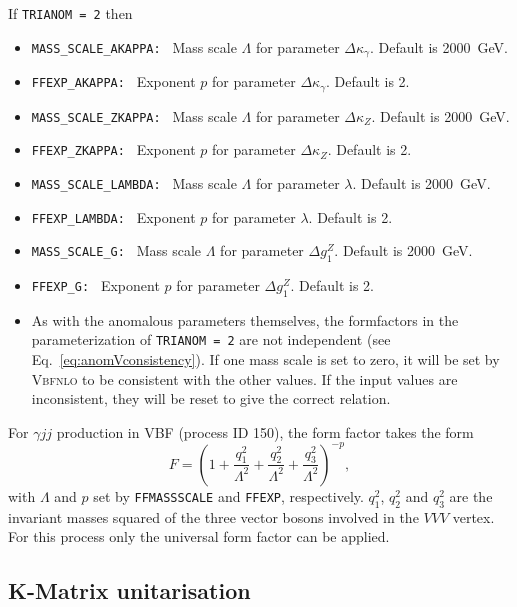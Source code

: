 \documentclass[english,12pt]{article}
\begin{document}
If {\tt TRIANOM = 2} then
\begin{itemize}
 \item {\tt MASS\_SCALE\_AKAPPA: } Mass scale $\Lambda$ for parameter $\Delta
\kappa_{\gamma}$.  Default is 2000~GeV.
 \item {\tt FFEXP\_AKAPPA: } Exponent $p$ for parameter $\Delta \kappa_{\gamma}$.  Default
is 2.
 \item {\tt MASS\_SCALE\_ZKAPPA: } Mass scale $\Lambda$ for parameter $\Delta
\kappa_{Z}$.  Default is 2000~GeV.
 \item {\tt FFEXP\_ZKAPPA: } Exponent $p$ for parameter $\Delta \kappa_{Z}$.  Default
is 2.
 \item {\tt MASS\_SCALE\_LAMBDA: } Mass scale $\Lambda$ for parameter $\lambda$.
 Default is 2000~GeV.
 \item {\tt FFEXP\_LAMBDA: } Exponent $p$ for parameter $\lambda$.  Default is
2.
 \item {\tt MASS\_SCALE\_G: } Mass scale $\Lambda$ for parameter $\Delta g_{1}^{Z}$. 
Default is 2000~GeV.
 \item {\tt FFEXP\_G: } Exponent $p$ for parameter $\Delta g_{1}^{Z}$.  Default is 2.
 \item As with the anomalous parameters themselves, the formfactors in the
parameterization of {\tt TRIANOM = 2} are not independent (see
Eq.~\eqref{eq:anomVconsistency}).  If one mass scale is set to zero, it will be
set by \textsc{Vbfnlo} to be consistent with the other values.  If the input
values are inconsistent, they will be reset to give the correct relation.
\end{itemize}

For $\gamma jj$ production in VBF (process ID 150), the form factor takes the form
\begin{equation}
 F = \left(1 + \frac{q_1^2}{\Lambda^{2}} + \frac{q_2^2}{\Lambda^{2}} + \frac{q_3^2}{\Lambda^{2}} \right)^{-p},
\end{equation}
with $\Lambda$ and $p$ set by {\tt FFMASSSCALE} and {\tt FFEXP}, respectively.
$q_1^2$, $q_2^2$ and $q_3^2$ are the invariant masses squared of the three vector bosons involved in the
$VVV$ vertex.
For this process only the universal form factor can be applied.

\subsection{K-Matrix unitarisation}
\label{sec:kmatrix}
\end{document}
